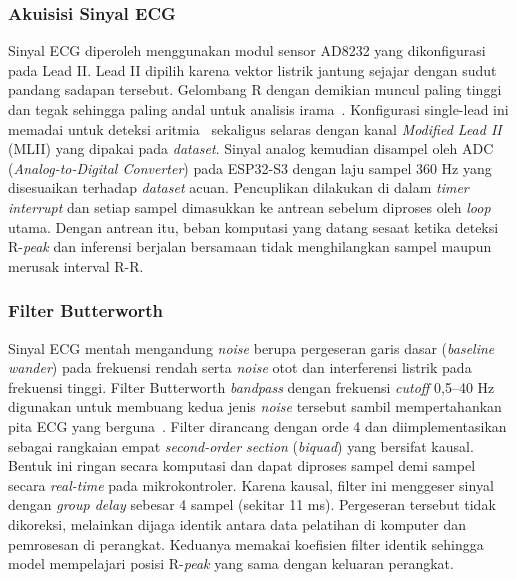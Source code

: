 \subsubsection{Akuisisi Sinyal ECG}

Sinyal ECG diperoleh menggunakan modul sensor AD8232 yang dikonfigurasi pada Lead II. Lead II dipilih karena vektor listrik jantung sejajar dengan sudut pandang sadapan tersebut. Gelombang R dengan demikian muncul paling tinggi dan tegak sehingga paling andal untuk analisis irama~\cite{ecg_goldberger}. Konfigurasi single-lead ini memadai untuk deteksi aritmia~\cite{dias_2021} sekaligus selaras dengan kanal \textit{Modified Lead II} (MLII) yang dipakai pada \textit{dataset}. Sinyal analog kemudian disampel oleh ADC (\textit{Analog-to-Digital Converter}) pada ESP32-S3 dengan laju sampel 360 Hz yang disesuaikan terhadap \textit{dataset} acuan. Pencuplikan dilakukan di dalam \textit{timer interrupt} dan setiap sampel dimasukkan ke antrean sebelum diproses oleh \textit{loop} utama. Dengan antrean itu, beban komputasi yang datang sesaat ketika deteksi R-\textit{peak} dan inferensi berjalan bersamaan tidak menghilangkan sampel maupun merusak interval R-R.

\subsubsection{Filter Butterworth}

Sinyal ECG mentah mengandung \textit{noise} berupa pergeseran garis dasar (\textit{baseline wander}) pada frekuensi rendah serta \textit{noise} otot dan interferensi listrik pada frekuensi tinggi. Filter Butterworth \textit{bandpass} dengan frekuensi \textit{cutoff} 0,5--40 Hz digunakan untuk membuang kedua jenis \textit{noise} tersebut sambil mempertahankan pita ECG yang berguna~\cite{zambrano_2026, bui_2021}. Filter dirancang dengan orde 4 dan diimplementasikan sebagai rangkaian empat \textit{second-order section} (\textit{biquad}) yang bersifat kausal. Bentuk ini ringan secara komputasi dan dapat diproses sampel demi sampel secara \textit{real-time} pada mikrokontroler.
Karena kausal, filter ini menggeser sinyal dengan \textit{group delay} sebesar 4 sampel (sekitar 11 ms). Pergeseran tersebut tidak dikoreksi, melainkan dijaga identik antara data pelatihan di komputer dan pemrosesan di perangkat. Keduanya memakai koefisien filter identik sehingga model mempelajari posisi R-\textit{peak} yang sama dengan keluaran perangkat.


